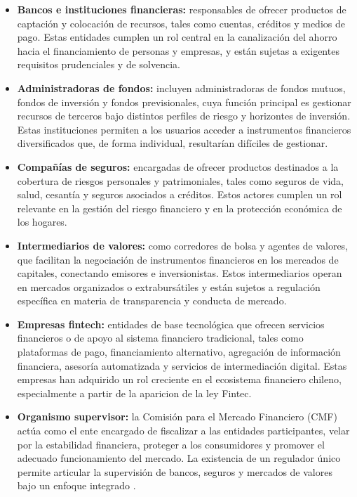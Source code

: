 \documentclass[
	spanish, %
	letterpaper, oneside
]{book}
\begin{document}
\begin{itemize}
    \item \textbf{Bancos e instituciones financieras:} responsables de ofrecer productos de captación y colocación de recursos, tales como cuentas, créditos y medios de pago. Estas entidades cumplen un rol central en la canalización del ahorro hacia el financiamiento de personas y empresas, y están sujetas a exigentes requisitos prudenciales y de solvencia. \cite{cmf_educa_sistema}


    
    \item \textbf{Administradoras de fondos:} incluyen administradoras de fondos mutuos, fondos de inversión y fondos previsionales, cuya función principal es gestionar recursos de terceros bajo distintos perfiles de riesgo y horizontes de inversión. Estas instituciones permiten a los usuarios acceder a instrumentos financieros diversificados que, de forma individual, resultarían difíciles de gestionar. \cite{cmf_educa_sistema}
    
    \item \textbf{Compañías de seguros:} encargadas de ofrecer productos destinados a la cobertura de riesgos personales y patrimoniales, tales como seguros de vida, salud, cesantía y seguros asociados a créditos. Estos actores cumplen un rol relevante en la gestión del riesgo financiero y en la protección económica de los hogares. \cite{cmf_educa_sistema}
    
    \item \textbf{Intermediarios de valores:} como corredores de bolsa y agentes de valores, que facilitan la negociación de instrumentos financieros en los mercados de capitales, conectando emisores e inversionistas. Estos intermediarios operan en mercados organizados o extrabursátiles y están sujetos a regulación específica en materia de transparencia y conducta de mercado. \cite{cmf_educa_sistema}

        \item \textbf{Empresas fintech:} entidades de base tecnológica que ofrecen servicios financieros o de apoyo al sistema financiero tradicional, tales como plataformas de pago, financiamiento alternativo, agregación de información financiera, asesoría automatizada y servicios de intermediación digital. Estas empresas han adquirido un rol creciente en el ecosistema financiero chileno, especialmente a partir de la aparicion de la ley Fintec. \cite{cmf_fintech}
    \item \textbf{Organismo supervisor:} la Comisión para el Mercado Financiero (CMF) actúa como el ente encargado de fiscalizar a las entidades participantes, velar por la estabilidad financiera, proteger a los consumidores y promover el adecuado funcionamiento del mercado. La existencia de un regulador único permite articular la supervisión de bancos, seguros y mercados de valores bajo un enfoque integrado \cite{cmf_supervision}.
\end{itemize}
\end{document}
